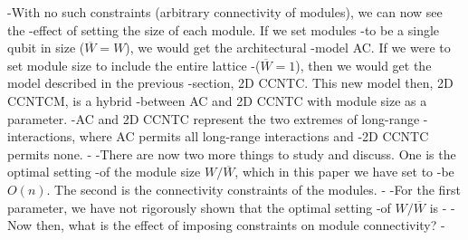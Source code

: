 -With no such constraints (arbitrary connectivity of modules), we can now see the
-effect of setting the size of each module. If we set modules
-to be a single qubit in size ($\overline{W} = W$), we would get the architectural
-model \textsf{AC}. If we were to set module size to include the entire lattice
-($\overline{W} = 1$), then we would get the model described in the previous
-section, \textsf{2D CCNTC}. This new model then, \textsf{2D CCNTCM}, is a hybrid
-between \textsf{AC} and \textsf{2D CCNTC} with module size as a parameter.
-\textsf{AC} and \textsf{2D CCNTC} represent the two extremes of long-range
-interactions, where \textsf{AC} permits all long-range interactions and
-\textsf{2D CCNTC} permits none.
-
-There are now two more things to study and discuss. One is the optimal setting
-of the module size $W/\overline{W}$, which in this paper we have set to
-be $O(n)$. The second is the connectivity constraints of the modules.
-
-For the first parameter, we have not rigorously shown that the optimal setting
-of $W / \overline{W}$ is 
-
-Now then, what is the effect of imposing constraints on module connectivity?
-

